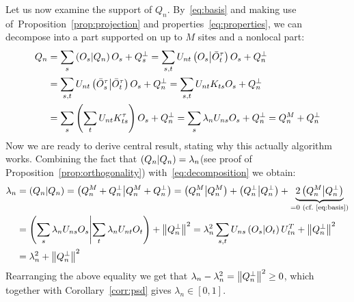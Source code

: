 Let us now examine the support of \(Q_n\). By~\eqref{eq:basis} and making use of~Proposition~\ref{prop:projection}
and properties~\eqref{eq:properties}, we can decompose into a part supported on up to \(M\) sites and a nonlocal part:
\begin{align}
  Q_n &=  \sum_s \left(O_s \middle| Q_n\right)O_s + Q_s^{\perp} = \sum_{s,t} U_{n t}\left(O_{s} \middle| \bar{O}_{t}^{\tau}\right)
  O_{s}+Q_{n}^{\perp} \nonumber \\
  &= \sum_{s,t} U_{n t}\left(\bar{O}_{s}^{\tau} \middle| \bar{O}_{t}^{\tau}\right) O_{s}+Q_{n}^{\perp}
  = \sum_{s,t} U_{n t}K_{ts} O_{s}+Q_{n}^{\perp} \nonumber \\
  &= \sum_s  \left( \sum_t U_{n t}K_{ts}^{\tau}\right) O_{s}+Q_{n}^{\perp} = \sum_{s} 
  \lambda_{n} U_{n s} O_{s}+Q_{n}^{\perp} = Q_{n}^{M}+Q_{n}^{\perp}
  \label{eq:decomposition}
\end{align}
Now we are ready to derive central result, stating why this actually algorithm works. Combining the fact that 
\(\left(Q_n \middle| Q_n\right) = \lambda_n \)(see proof of Proposition~\ref{prop:orthogonality}) with~\eqref{eq:decomposition} we obtain:
\begin{align}
  \lambda_n &= \left(Q_n \middle| Q_n\right) = \left(Q_n^M + Q_n^{\perp} \middle| Q_n^M + Q_n^{\perp}\right) = \left(Q_n^M \middle| Q_n^M\right) +
   \left(Q_n^{\perp} \middle| Q_n^{\perp}\right) + \underbrace{2 \left(Q_n^M \middle| Q_n^{\perp}\right)}_{=0 \text{ (cf.~\eqref{eq:basis})}} \nonumber \\
   &= \left(\sum_s \lambda_n U_{ns} O_s \middle| \sum_t \lambda_n U_{nt} O_t\right) + \norm{Q_n^{\perp}}^2 =
  \lambda_n^2 \sum_{s,t} U_{ns} \left(O_s \middle| O_t\right) U_{tn}^{T} + \norm{Q_n^{\perp}}^2  \nonumber \\
  &=\lambda_n^2 + \norm{Q_n^{\perp}}^2
\end{align}
Rearranging the above equality we get that \(\lambda_n - \lambda_n^2 = \norm{Q_n^{\perp}}^2 \geq 0\), which together with
Corollary~\ref{corr:psd} gives \(\lambda_n \in \left[0,1\right]\). 


